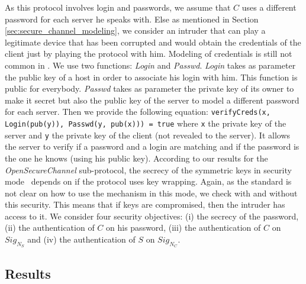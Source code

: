 As this protocol involves login and passwords, we assume that $C$ uses a
different password for each server he speaks with.
Else as mentioned in Section \ref{sec:secure_channel_modeling}, we consider an
intruder that can play a legitimate device that has been corrupted and would
obtain the credentials of the client just by playing the protocol with him.
Modeling of credentials is still not common in \proverif.
We use two functions: {\em Login} and {\em
  Passwd}.  {\em Login} takes as parameter the public key of a host in
order to associate his login with him. This function is public for
everybody.  {\em Passwd} takes as parameter the private key of its
owner to make it secret but also the public key of the server to model
a different password for each server.  Then we provide the following
equation: \texttt{verifyCreds(x, Login(pub(y)), Passwd(y, pub(x))) =
  true} where \texttt{x} the private key of the server and \texttt{y}
the private key of the client (not revealed to the server).  It allows
the server to verify if a password and a login are matching and if the
password is the one he knows (using his public key).
According to our results for the {\em OpenSecureChannel} sub-protocol, the
secrecy of the symmetric keys in security mode \sms~depends on if the protocol
uses key wrapping.
Again, as the \opcua{} standard is not clear on how to use the mechanism in
this mode, we check with and without this security.
This means that if keys are compromised, then the intruder has access to it.
We consider four security objectives: (i) the secrecy of the
password, (ii) the authentication of $C$ on his password, (iii) the
authentication of $C$ on $Sig_{N_{S}}$ and (iv) the authentication of $S$ on
$Sig_{N_{C}}$.

\subsection{Results}

